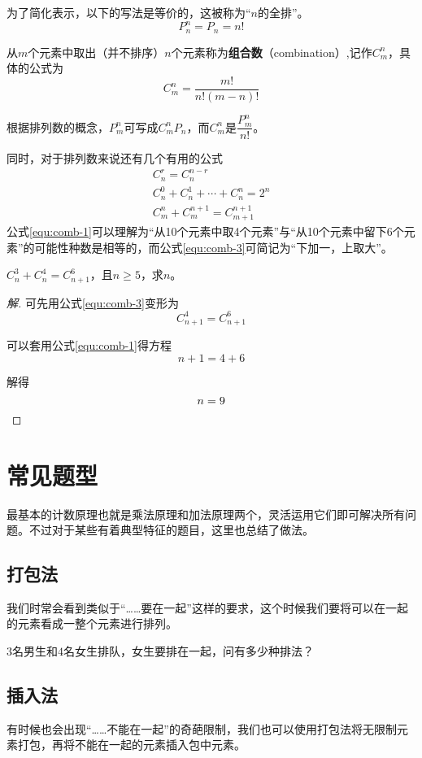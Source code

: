 为了简化表示，以下的写法是等价的，这被称为“$n$的全排”。\[P_n^n=P_n=n!\]

从$m$个元素中取出（并不排序）$n$个元素称为\textbf{组合数}（combination）,记作$C_m^n$，具体的公式为\[C_m^n=\frac{m!}{n!(m-n)!}\]

根据排列数的概念，$P_m^n$可写成$C_m^nP_n$，而$C_m^n$是$\dfrac{P_m^n}{n!}$。

同时，对于排列数来说还有几个有用的公式
\begin{gather}
	C_n^r=C_n^{n-r} \label{equ:comb-1} \\
	C_n^0+C_n^1+\cdots+C_n^n=2^n \label{equ:comb-2} \\
	C_m^n+C_m^{n+1}=C_{m+1}^{n+1} \label{equ:comb-3}
\end{gather}
公式\eqref{equ:comb-1}可以理解为“从10个元素中取4个元素”与“从10个元素中留下6个元素”的可能性种数是相等的，而公式\eqref{equ:comb-3}可简记为“下加一，上取大”。

\begin{example}
	$C_n^3+C_n^4=C_{n+1}^6$，且$n\geq5$，求$n$。
\end{example}

\begin{proof}[解]
	可先用公式\eqref{equ:comb-3}变形为\[C_{n+1}^4=C_{n+1}^6\]

	可以套用公式\eqref{equ:comb-1}得方程\[n+1=4+6\]

	解得\[n=9 \qedhere\]
\end{proof}

\section{常见题型}
最基本的计数原理也就是乘法原理和加法原理两个，灵活运用它们即可解决所有问题。不过对于某些有着典型特征的题目，这里也总结了做法。

\subsection{打包法}
我们时常会看到类似于“\ldots\ldots 要在一起”这样的要求，这个时候我们要将可以在一起的元素看成一整个元素进行排列。

\begin{example}
	$3$名男生和$4$名女生排队，女生要排在一起，问有多少种排法？
\end{example}

\subsection{插入法}
有时候也会出现“\ldots\ldots 不能在一起”的奇葩限制，我们也可以使用打包法将无限制元素打包，再将不能在一起的元素插入包中元素。

